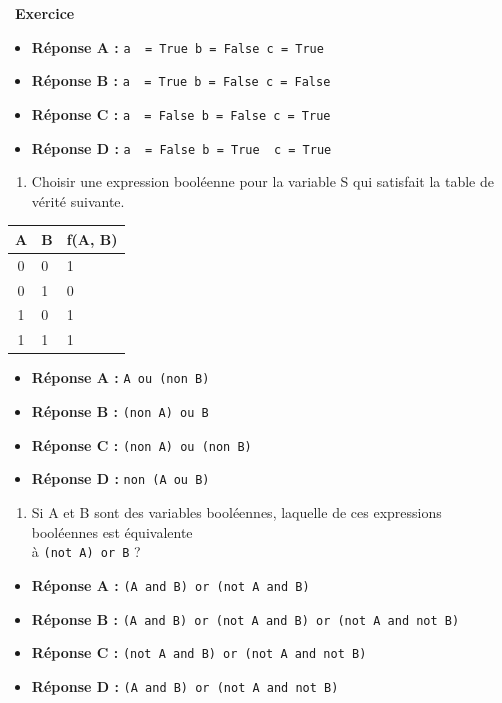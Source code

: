 \documentclass[
  11pt,
]{article}
\newcommand{\passthrough}[1]{#1}
\providecommand{\tightlist}{%
  \setlength{\itemsep}{0pt}\setlength{\parskip}{0pt}}
\newcounter{exo}
\newenvironment{exercice}[1]
{\par \medskip   \addtocounter{exo}{1} \noindent  
\begin{bclogo}[arrondi =0.1,   noborder = true, logo=\bccrayon, marge=4]{~\textbf{Exercice} \textbf{\theexo} {\itshape #1} }  \par}
{
\end{bclogo}
 \par \bigskip }
\newcounter{def}
\begin{document}
\begin{exercice}{}
\begin{itemize}
\tightlist
\item
  \textbf{Réponse A :}
  \passthrough{\lstinline!a  = True b = False c = True!}
\item
  \textbf{Réponse B :}
  \passthrough{\lstinline!a  = True b = False c = False!}
\item
  \textbf{Réponse C :}
  \passthrough{\lstinline!a  = False b = False c = True!}
\item
  \textbf{Réponse D :}
  \passthrough{\lstinline!a  = False b = True  c = True!}
\end{itemize}

\begin{enumerate}
\def\labelenumi{\arabic{enumi}.}
\setcounter{enumi}{3}
\tightlist
\item
  Choisir une expression booléenne pour la variable S qui satisfait la
  table de vérité suivante.
\end{enumerate}

\begin{longtable}[]{@{}cll@{}}
\toprule
A & B & f(A, B)\tabularnewline
\midrule
\endhead
0 & 0 & 1\tabularnewline
0 & 1 & 0\tabularnewline
1 & 0 & 1\tabularnewline
1 & 1 & 1\tabularnewline
\bottomrule
\end{longtable}

\begin{itemize}
\tightlist
\item
  \textbf{Réponse A :} \passthrough{\lstinline!A ou (non B)!}
\item
  \textbf{Réponse B :} \passthrough{\lstinline!(non A) ou B!}
\item
  \textbf{Réponse C :} \passthrough{\lstinline!(non A) ou (non B)!}
\item
  \textbf{Réponse D :} \passthrough{\lstinline!non (A ou B)!}
\end{itemize}

\begin{enumerate}
\def\labelenumi{\arabic{enumi}.}
\setcounter{enumi}{4}
\tightlist
\item
  Si A et B sont des variables booléennes, laquelle de ces expressions
  booléennes est équivalente\\
  à \passthrough{\lstinline!(not A) or B!} ?
\end{enumerate}

\begin{itemize}
\tightlist
\item
  \textbf{Réponse A :}
  \passthrough{\lstinline!(A and B) or (not A and B)!}
\item
  \textbf{Réponse B :}
  \passthrough{\lstinline!(A and B) or (not A and B) or (not A and not B)!}
\item
  \textbf{Réponse C :}
  \passthrough{\lstinline!(not A and B) or (not A and not B)!}
\item
  \textbf{Réponse D :}
  \passthrough{\lstinline!(A and B) or (not A and not B)!}
\end{itemize}


\end{exercice}
\end{document}

